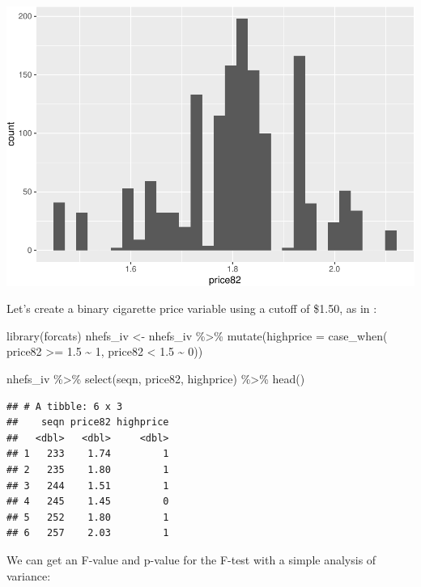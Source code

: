 \documentclass[
]{book}
\newenvironment{Shaded}{\begin{snugshade}}{\end{snugshade}}
\newcommand{\AttributeTok}[1]{\textcolor[rgb]{0.77,0.63,0.00}{#1}}
\newcommand{\DecValTok}[1]{\textcolor[rgb]{0.00,0.00,0.81}{#1}}
\newcommand{\FloatTok}[1]{\textcolor[rgb]{0.00,0.00,0.81}{#1}}
\newcommand{\FunctionTok}[1]{\textcolor[rgb]{0.00,0.00,0.00}{#1}}
\newcommand{\NormalTok}[1]{#1}
\newcommand{\OtherTok}[1]{\textcolor[rgb]{0.56,0.35,0.01}{#1}}
\newcommand{\SpecialCharTok}[1]{\textcolor[rgb]{0.00,0.00,0.00}{#1}}
\begin{document}
\includegraphics{adv_epi_analysis_files/figure-latex/unnamed-chunk-315-1.pdf}

Let's create a binary cigarette price variable using a cutoff of \$1.50, as in \citet{hernanch16}:

\begin{Shaded}
\begin{Highlighting}[]
\FunctionTok{library}\NormalTok{(forcats)}
\NormalTok{nhefs\_iv }\OtherTok{\textless{}{-}}\NormalTok{ nhefs\_iv }\SpecialCharTok{\%\textgreater{}\%} 
 \FunctionTok{mutate}\NormalTok{(}\AttributeTok{highprice =} \FunctionTok{case\_when}\NormalTok{(}
\NormalTok{    price82 }\SpecialCharTok{\textgreater{}=} \FloatTok{1.5} \SpecialCharTok{\textasciitilde{}} \DecValTok{1}\NormalTok{, }
\NormalTok{    price82 }\SpecialCharTok{\textless{}} \FloatTok{1.5} \SpecialCharTok{\textasciitilde{}} \DecValTok{0}\NormalTok{))}

\NormalTok{nhefs\_iv }\SpecialCharTok{\%\textgreater{}\%} 
  \FunctionTok{select}\NormalTok{(seqn, price82, highprice) }\SpecialCharTok{\%\textgreater{}\%} 
  \FunctionTok{head}\NormalTok{()}
\end{Highlighting}
\end{Shaded}

\begin{verbatim}
## # A tibble: 6 x 3
##    seqn price82 highprice
##   <dbl>   <dbl>     <dbl>
## 1   233    1.74         1
## 2   235    1.80         1
## 3   244    1.51         1
## 4   245    1.45         0
## 5   252    1.80         1
## 6   257    2.03         1
\end{verbatim}

We can get an F-value and p-value for the F-test with a simple analysis of variance:
\end{document}
